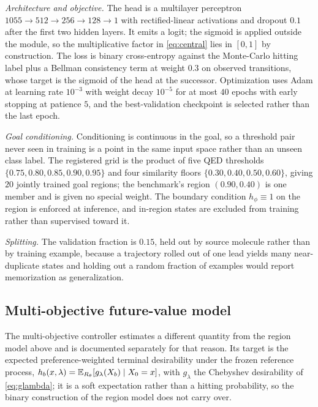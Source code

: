 \emph{Architecture and objective.} The head is a multilayer perceptron $1055\rightarrow512\rightarrow256\rightarrow128\rightarrow1$ with rectified-linear activations and dropout $0.1$ after the first two hidden layers. It emits a logit; the sigmoid is applied outside the module, so the multiplicative factor in \eqref{eq:central} lies in $[0,1]$ by construction. The loss is binary cross-entropy against the Monte-Carlo hitting label plus a Bellman consistency term at weight $0.3$ on observed transitions, whose target is the sigmoid of the head at the successor. Optimization uses Adam at learning rate $10^{-3}$ with weight decay $10^{-5}$ for at most $40$ epochs with early stopping at patience $5$, and the best-validation checkpoint is selected rather than the last epoch.

\emph{Goal conditioning.} Conditioning is continuous in the goal, so a threshold pair never seen in training is a point in the same input space rather than an unseen class label. The registered grid is the product of five QED thresholds $\{0.75,0.80,0.85,0.90,0.95\}$ and four similarity floors $\{0.30,0.40,0.50,0.60\}$, giving $20$ jointly trained goal regions; the benchmark's region $(0.90,0.40)$ is one member and is given no special weight. The boundary condition $h_\phi\equiv1$ on the region is enforced at inference, and in-region states are excluded from training rather than supervised toward it.

\emph{Splitting.} The validation fraction is $0.15$, held out by source molecule rather than by training example, because a trajectory rolled out of one lead yields many near-duplicate states and holding out a random fraction of examples would report memorization as generalization.

\subsection{Multi-objective future-value model}
\label{app:mo-controller}

The multi-objective controller estimates a different quantity from the region model above and is documented separately for that reason. Its target is the expected preference-weighted terminal desirability under the frozen reference process, $h_b(x,\lambda)=\mathbb{E}_{R_\theta}[g_\lambda(X_b)\mid X_0=x]$, with $g_\lambda$ the Chebyshev desirability of \eqref{eq:glambda}; it is a soft expectation rather than a hitting probability, so the binary construction of the region model does not carry over.

